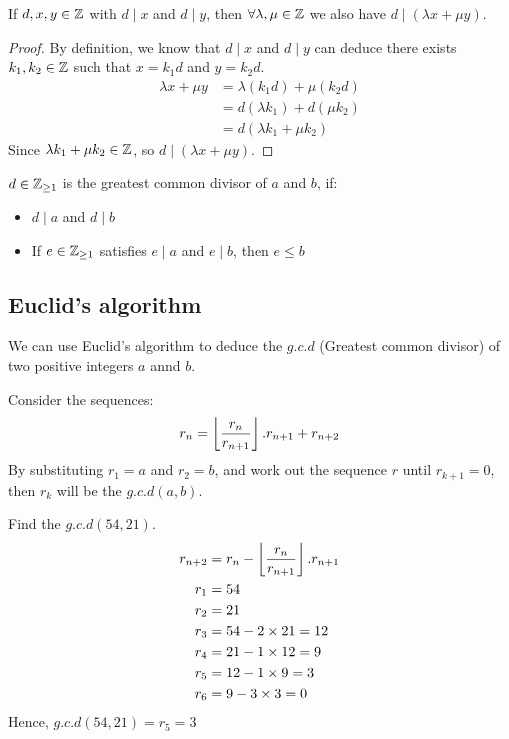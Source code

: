 \documentclass[a4paper]{article}
\begin{document}
\begin{thm}
If $d,x,y \in \mathbb{Z}$ with $d \mid x$ and $d \mid y$, then $\forall \lambda, \mu \in \mathbb{Z}$ we also have $d \mid (\lambda x + \mu y)$.
\end{thm}
\begin{proof}
By definition, we know that $d \mid x$ and $d \mid y$ can deduce there exists $k_1, k_2 \in \mathbb{Z}$ such that $x = k_1d$ and $y = k_2d$.
\begin{align*}
\lambda x + \mu y &= \lambda (k_1d) + \mu (k_2d)\\
&= d(\lambda k_1) + d(\mu k_2)\\
&= d(\lambda k_1 + \mu k_2)
\end{align*}
Since $\lambda k_1 + \mu k_2 \in \mathbb{Z}$, so $d \mid (\lambda x + \mu y)$.
\end{proof}

\begin{defi}
$d \in \mathbb{Z}_{\geq 1}$ is the greatest common divisor of $a$ and $b$, if:
\begin{itemize}
	\item $d \mid a$ and $d \mid b$
	\item If $e \in \mathbb{Z}_{\geq 1}$ satisfies $e \mid a$ and $e \mid b$, then $e \leq b$
\end{itemize}
\end{defi}

\subsection{Euclid’s algorithm}
We can use Euclid’s algorithm to deduce the $g.c.d$ (Greatest common divisor) of two positive integers $a$ annd $b$.

Consider the sequences: $$r_n = \left\lfloor \frac{r_n}{r_{n+1}} \right\rfloor . r_{n+1} + r_{n+2}$$
By substituting $r_1 = a$ and $r_2 = b$, and work out the sequence $r$ until $r_{k+1} = 0$, then $r_{k}$ will be the $g.c.d(a,b)$.
\begin{eg}
Find the $g.c.d(54, 21)$.
\begin{align*}
r_{n+2} &= r_n - \left\lfloor \frac{r_n}{r_{n+1}} \right\rfloor . r_{n+1}\\
r_1 &= 54 \\
r_2 &= 21 \\
r_3 &= 54 - 2 \times 21 = 12 \\
r_4 &= 21 - 1 \times 12 = 9 \\
r_5 &= 12 - 1 \times 9 = 3 \\
r_6 &= 9 - 3 \times 3 = 0
\end{align*}
Hence, $g.c.d(54, 21) = r_5 = 3$
\end{eg}
\end{document}
